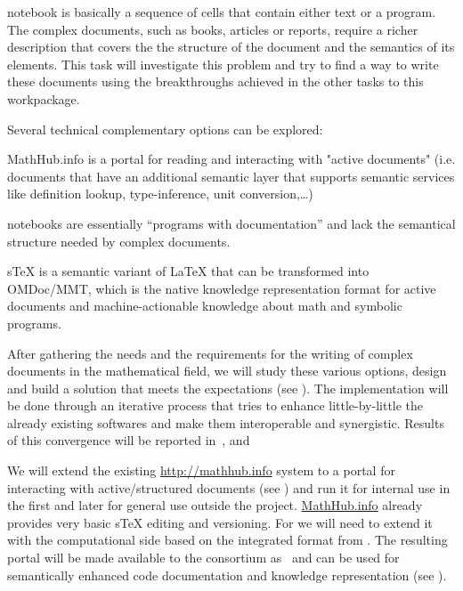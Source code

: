\begin{workpackage}
\begin{tasklist}
\begin{task}[title=Structured documents,id=structdocs,
  lead=JU,PM=22,lead=JU,partners={SR,USH,LL},wphases=0-24]
  \Jupyter notebook is basically a sequence of cells that contain either text or a
  program. The complex documents, such as books, articles or reports, require a richer
  description that covers the the structure of the document and the semantics of its
  elements. This task will investigate this problem and try to find a way to write these
  documents using the breakthroughs achieved in the other tasks to this workpackage.

  Several technical complementary options can be explored:
  \begin{compactitem}
  \item MathHub.info is a portal for reading and interacting with "active documents"
    (i.e. documents that have an additional semantic layer that supports semantic services
    like definition lookup, type-inference, unit conversion,\ldots)
  \item \Jupyter notebooks are essentially ``programs with documentation'' and lack the
    semantical structure needed by complex documents.
  \item sTeX is a semantic variant of LaTeX that can be transformed into OMDoc/MMT, which
    is the native knowledge representation format for active documents and
    machine-actionable knowledge about math and symbolic programs.
  \end{compactitem}

  After gathering the needs and the requirements for the writing of complex documents in
  the mathematical field, we will study these various options, design and build a solution
  that meets the expectations (see ). The implementation will be
  done through an iterative process that tries to enhance little-by-little the already
  existing softwares and make them interoperable and synergistic.  Results of this
  convergence will be reported in~,
   and 
\end{task}

\begin{task}[id=mathhub,title=Active Documents Portal,lead=JU,PM=12,
  wphases=12-36!.5]
  We will extend the existing \url{http://mathhub.info} system to a portal for interacting
  with active/structured documents (see ) and run it for internal
  use in the \TheProject first and later for general use outside the
  project. \url{MathHub.info} already provides very basic sTeX editing and versioning. For
  \TheProject we will need to extend it with the computational side based on the
  integrated format from . The resulting portal will be made
  available to the consortium as~ and can be used for
  semantically enhanced code documentation and knowledge representation (see ).
\end{task}


\end{tasklist}
\end{workpackage}
